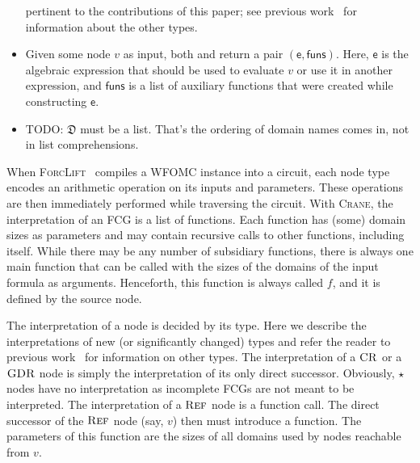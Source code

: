 \documentclass{article}
\theoremstyle{definition}
\theoremstyle{remark}
\DeclareMathOperator{\CR}{\textsc{CR}}
\DeclareMathOperator{\GDR}{\textsc{GDR}}
\DeclareMathOperator{\Reff}{\textsc{Ref}}
\begin{document}
\begin{itemize}
        pertinent to the contributions of this paper; see previous
        work~\cite{DBLP:conf/ijcai/BroeckTMDR11} for information about the other
        types.
  \item Given some node $v$ as input, both \visit and \actuallyVisit return a
        pair $(\mathsf{e}, \mathsf{funs})$. Here, $\mathsf{e}$ is the algebraic
        expression that should be used to evaluate $v$ or use it in another
        expression, and $\mathsf{funs}$ is a list of auxiliary functions that
        were created while constructing $\mathsf{e}$.
  \item TODO: $\mathfrak{D}$ must be a list. That's the ordering of domain names
        comes in, not in list comprehensions.
\end{itemize}

When \textsc{ForcLift}~\cite{DBLP:conf/ijcai/BroeckTMDR11} compiles a WFOMC
instance into a circuit, each node type encodes an arithmetic operation on its
inputs and parameters. These operations are then immediately performed while
traversing the circuit. With \textsc{Crane}, the interpretation of an FCG is a
list of functions. Each function has (some) domain sizes as parameters and may
contain recursive calls to other functions, including itself. While there may be
any number of subsidiary functions, there is always one main function that can
be called with the sizes of the domains of the input formula as arguments.
Henceforth, this function is always called $f$, and it is defined by the source
node.

The interpretation of a node is decided by its type. Here we describe the
interpretations of new (or significantly changed) types and refer the reader to
previous work~\cite{DBLP:conf/ijcai/BroeckTMDR11} for information on other
types. The interpretation of a $\CR$ or a $\GDR$ node is simply the
interpretation of its only direct successor. Obviously, $\star$ nodes have no
interpretation as incomplete FCGs are not meant to be interpreted. The
interpretation of a $\Reff$ node is a function call. The direct successor of the
$\Reff$ node (say, $v$) then must introduce a function. The parameters of this
function are the sizes of all domains used by nodes reachable from $v$.
\end{document}
